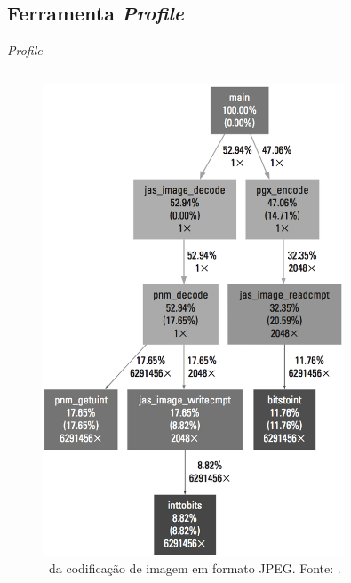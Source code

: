 
   \subsection{Ferramenta {\it Profile}}

      \begin{frame}{\textit{Profile}} \vspace{-1em}
         
         \begin{columns}
            \begin{column}{0.5\textwidth}
               
               \begin{figure}[h] \centering
                  \vspace{-24pt}
                  \includegraphics[width=0.8\textwidth]{img/f4-1-2.png}
                  \caption{\Profile\ da codificação de imagem em formato JPEG. Fonte: \cite{Sass2010}.}

\end{figure}
\end{column}
\end{columns}
\end{frame}
